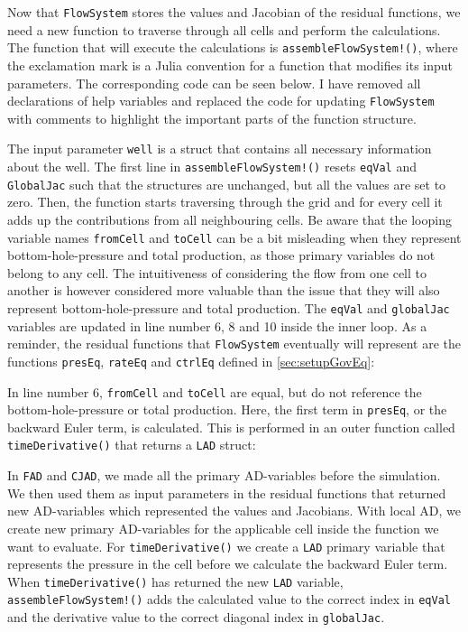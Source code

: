 Now that \texttt{FlowSystem} stores the  values and Jacobian of the residual functions, we need a new function to traverse through all cells and perform the calculations. The function that will execute the calculations is \texttt{assembleFlowSystem!()}, where the exclamation mark is a Julia convention for a function that modifies its input parameters. The corresponding code can be seen below. I have removed all declarations of help variables and replaced the code for updating \texttt{FlowSystem} with comments to highlight the important parts of the function structure.
\lstset{numbers=left}

\lstset{numbers=none}
The input parameter \texttt{well} is a struct that contains all necessary information about the well. The first line in \texttt{assembleFlowSystem!()} resets \texttt{eqVal} and \texttt{GlobalJac} such that the structures are unchanged, but all the values are set to zero. Then, the function starts traversing through the grid and for every cell it adds up the contributions from all neighbouring cells. Be aware that the looping variable names \texttt{fromCell} and \texttt{toCell} can be a bit misleading when they represent bottom-hole-pressure and total production, as those primary variables do not belong to any cell. The intuitiveness of considering the flow from one cell to another is however considered more valuable than the issue that they will also represent bottom-hole-pressure and total production. The \texttt{eqVal} and \texttt{globalJac} variables are updated in line number 6, 8 and 10 inside the inner loop. As a reminder, the residual functions that \texttt{FlowSystem} eventually will represent are the functions \texttt{presEq}, \texttt{rateEq} and \texttt{ctrlEq} defined in \autoref{sec:setupGovEq}:

In line number 6, \texttt{fromCell} and \texttt{toCell} are equal, but do not reference the bottom-hole-pressure or total production. Here, the first term in \texttt{presEq}, or the backward Euler term, is calculated. This is performed in an outer function called \texttt{timeDerivative()} that returns a \texttt{LAD} struct:

In \texttt{FAD} and \texttt{CJAD}, we made all the primary AD-variables before the simulation. We then used them as input parameters in the residual functions that returned new AD-variables which represented the values and Jacobians. With local AD, we create new primary AD-variables for the applicable cell inside the function we want to evaluate. For \texttt{timeDerivative()} we create a \texttt{LAD} primary variable that represents the pressure in the cell before we calculate the backward Euler term. When \texttt{timeDerivative()} has returned the new \texttt{LAD} variable, \texttt{assembleFlowSystem!()} adds the calculated value to the correct index in \texttt{eqVal} and the derivative value to the correct diagonal index in \texttt{globalJac}.

